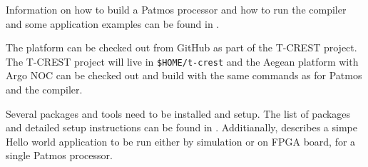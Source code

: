 \documentclass[a4paper,fontsize=10pt,twoside,DIV15,BCOR12mm,headinclude=true,footinclude=false,pagesize,bibtotoc]{scrbook}
\newcommand{\code}[1]{{\texttt{#1}}}
\begin{document}
Information on how to build a Patmos processor and how to run the compiler and some application examples
can be found in \cite{patmos-handbook}. 


The platform can be checked out from GitHub as part of the T-CREST project.
The T-CREST project will live in \code{\$HOME/t-crest} and the Aegean platform with Argo NOC
can be checked out and build with the same commands as for Patmos and the compiler.%



Several packages and tools need to be installed and setup. The list of packages 
and detailed setup instructions can be found in \cite{patmos-handbook}.
Additianally, \cite{patmos-handbook} describes a simpe Hello world application 
to be run either by simulation or on FPGA board, for a single Patmos processor.
\end{document}
